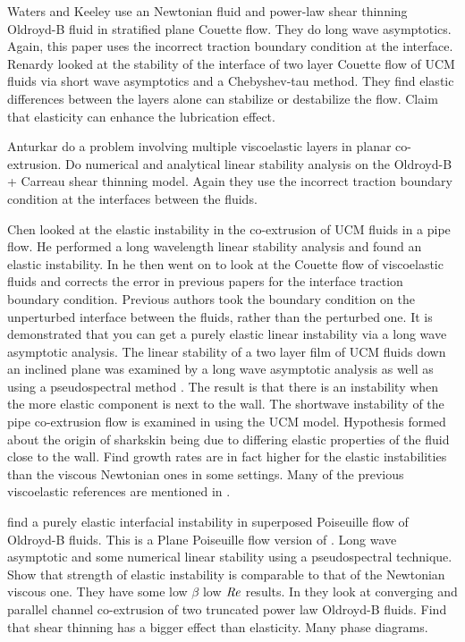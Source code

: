 \documentclass{jfm}
\newcommand\Rey{\mbox{\textit{Re}}}  %
\begin{document}
Waters and Keeley \citep{Waters1987} use an Newtonian fluid and power-law shear
thinning Oldroyd-B fluid in stratified plane Couette flow. They do long wave
asymptotics. Again, this paper uses the incorrect traction boundary condition
at the interface.  Renardy \citep{Renardy1988} looked at the stability of the
interface of two layer Couette flow of UCM fluids via short wave asymptotics
and a Chebyshev-tau method. They find elastic differences between the layers
alone can stabilize or destabilize the flow. Claim that elasticity can enhance
the lubrication effect. 

Anturkar \citep{Anturkar1990} do a problem involving multiple viscoelastic
layers in planar co-extrusion. Do numerical and analytical linear stability
analysis on the Oldroyd-B + Carreau shear thinning model.  Again they use the
incorrect traction boundary condition at the interfaces between the fluids.

Chen \citep{Chen1991a} looked at the elastic instability in the co-extrusion of
UCM fluids in a pipe flow. He performed a long wavelength linear stability
analysis and found an elastic instability. In \citep{Chen1991b} he then went on
to look at the Couette flow of viscoelastic fluids and corrects the error in
previous papers \citep{Li1969, Waters1987, Anturkar1990} for the interface
traction boundary condition. Previous authors took the boundary condition on
the unperturbed interface between the fluids, rather than the perturbed one.
It is demonstrated that you can get a purely elastic linear instability via a
long wave asymptotic analysis. The linear stability of a two layer film of UCM
fluids down an inclined plane was examined by a long wave asymptotic analysis
as well as using a pseudospectral method \citep{Chen1992a}. The result is that
there is an instability when the more elastic component is next to the wall.
The shortwave instability of the pipe co-extrusion flow is examined in
\citep{Chen1992b} using the UCM model. Hypothesis formed about the origin of
sharkskin being due to differing elastic properties of the fluid close to the
wall.  Find growth rates are in fact higher for the elastic instabilities than
the viscous Newtonian ones in some settings. Many of the previous viscoelastic
references are mentioned in \citep{Larson1992}.

\citet{Su1992a} find a purely elastic interfacial instability in superposed
Poiseuille flow of Oldroyd-B fluids. This is a Plane Poiseuille flow version of
\citep{Chen1992a}. Long wave asymptotic and some numerical linear stability
using a pseudospectral technique. Show that strength of elastic instability is
comparable to that of the Newtonian viscous one. They have some low $\beta$ low
$\Rey$ results. In \citet{Su1992b} they look at converging and parallel channel
co-extrusion of two truncated power law Oldroyd-B fluids.  Find that shear
thinning has a bigger effect than elasticity.  Many phase diagrams.
\end{document}
